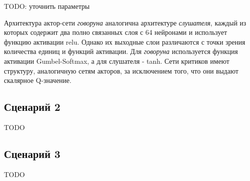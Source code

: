 TODO: уточнить параметры

Архитектура актор-сети \textit{говоруна} аналогична архитектуре \textit{слушателя}, каждый из которых содержит два полно связанных слоя с 64 нейронами и использует функцию активации relu. Однако их выходные слои различаются с точки зрения количества единиц и функций активации. Для \textit{говоруна} используется функция активации Gumbel-Softmax, а для слушателя - tanh. Сети критиков имеют структуру, аналогичную сетям акторов, за исключением того, что они выдают скалярное Q-значение.

\subsection{Сценарий 2}

TODO

\subsection{Сценарий 3}

TODO

\newpage
